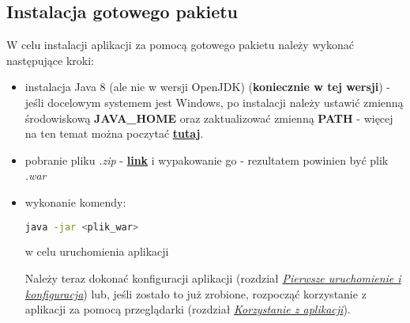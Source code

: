 \documentclass[12pt] {article}
\begin{document}
\subsection{Instalacja gotowego pakietu}
W celu instalacji aplikacji za pomocą gotowego pakietu należy wykonać następujące kroki:
\begin{itemize}
\item instalacja Java 8 (ale nie w wersji OpenJDK) (\textbf{koniecznie w tej wersji}) - jeśli docelowym systemem jest Windows, po instalacji należy ustawić zmienną środowiskową \textbf{JAVA\_HOME} oraz zaktualizować zmienną \textbf{PATH} - więcej na ten temat można poczytać \href{https://javatutorial.net/set-java-home-windows-10}{\textbf{tutaj}}.
\item pobranie pliku \emph{.zip} - \href{https://drive.google.com/drive/folders/1Og7IyqD11dZidbaHRg74Lt1glxVRp3ls}{\textbf{link}} i wypakowanie go - rezultatem powinien być plik \emph{.war}
\item wykonanie komendy:
\begin{lstlisting}[language=bash]
java -jar <plik_war>
\end{lstlisting}
w celu uruchomienia aplikacji

Należy teraz dokonać konfiguracji aplikacji (rozdział \hyperref[first_run]{\emph{Pierwsze uruchomienie i konfiguracja}}) lub, jeśli zostało to już zrobione, rozpocząć korzystanie z aplikacji za pomocą przeglądarki (rozdział \hyperref[webapp]{\emph{Korzystanie z aplikacji}}).
\end{itemize}
\end{document}
